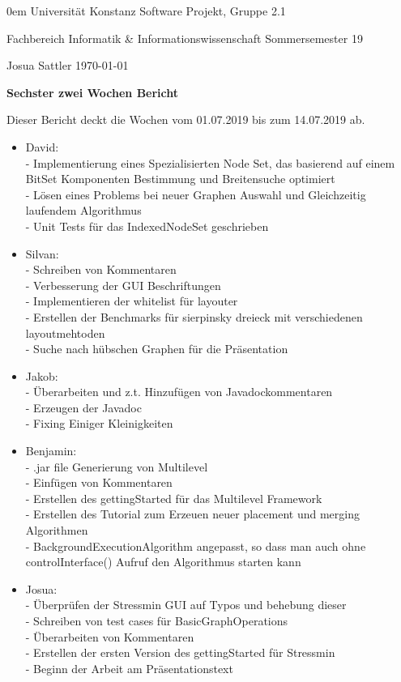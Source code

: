 \documentclass[]{article}
\date{}
\begin{document}
	
	{\footnotesize \parindent0em
		{\sc Universität Konstanz} \hfill {\sc Software Projekt, Gruppe 2.1}\par
		{\sc Fachbereich Informatik \& Informationswissenschaft} \hfill Sommersemester 19 \par
		Josua Sattler \hfill \today\par
		\bigskip
		\begin{center}
			{\LARGE\bf Sechster zwei Wochen Bericht}
			\bigskip
		\end{center}
	}
	
	Dieser Bericht deckt die Wochen vom 01.07.2019 bis zum 14.07.2019 ab. \\
	
	\begin{itemize}
				
		\item  David: \\
			- Implementierung eines Spezialisierten Node Set, das basierend auf einem BitSet Komponenten Bestimmung und Breitensuche optimiert\\
            - Lösen eines Problems bei neuer Graphen Auswahl und Gleichzeitig laufendem Algorithmus\\
            - Unit Tests für das IndexedNodeSet geschrieben	
		\item Silvan: \\
		- Schreiben von Kommentaren \\
		- Verbesserung der GUI Beschriftungen \\
		- Implementieren der whitelist für layouter  \\
		- Erstellen der Benchmarks für sierpinsky dreieck mit verschiedenen layoutmehtoden\\
		- Suche nach hübschen Graphen für die Präsentation
		\item Jakob: \\
		- Überarbeiten und z.t. Hinzufügen von Javadockommentaren\\
        - Erzeugen der Javadoc\\
        - Fixing Einiger Kleinigkeiten
		\item Benjamin: \\
		- .jar file Generierung von Multilevel\\
        - Einfügen von Kommentaren\\
        - Erstellen des gettingStarted für das Multilevel Framework\\ - Erstellen des Tutorial zum Erzeuen neuer placement und merging Algorithmen\\
        - BackgroundExecutionAlgorithm angepasst, so dass man auch ohne controlInterface() Aufruf den Algorithmus starten kann
		\item Josua: \\
		- Überprüfen der Stressmin GUI auf Typos und behebung dieser\\
		- Schreiben von test cases für BasicGraphOperations\\
		- Überarbeiten von Kommentaren\\
		- Erstellen der ersten Version des gettingStarted für Stressmin\\
		- Beginn der Arbeit am Präsentationstext
		
	\end{itemize} 
	
\end{document}
